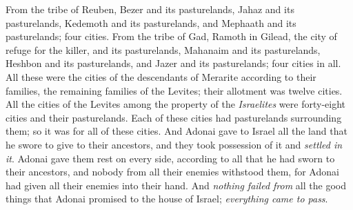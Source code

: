 \begin{biblechapter}
\verse From the tribe of Reuben, Bezer and its pasturelands, Jahaz and its pasturelands,
\verse Kedemoth and its pasturelands, and Mephaath and its pasturelands; four cities.
\verse From the tribe of Gad, Ramoth in Gilead, the city of refuge for the killer, and its pasturelands, Mahanaim and its pasturelands,
\verse Heshbon and its pasturelands, and Jazer and its pasturelands; four cities in all.
\verse All these were the cities of the descendants of Merarite according to their families, the remaining families of the Levites; their allotment was twelve cities.
\verse All the cities of the Levites among the property of the \textit{Israelites} were forty-eight cities and their pasturelands.
\verse Each of these cities had pasturelands surrounding them; so it was for all of these cities.
\verse And Adonai gave to Israel all the land that he swore to give to their ancestors, and they took possession of it and \textit{settled in it}.
\verse Adonai gave them rest on every side, according to all that he had sworn to their ancestors, and nobody from all their enemies withstood them, for Adonai had given all their enemies into their hand.
\verse And \textit{nothing failed from} all the good things that Adonai promised to the house of Israel; \textit{everything came to pass}.
\end{biblechapter}

